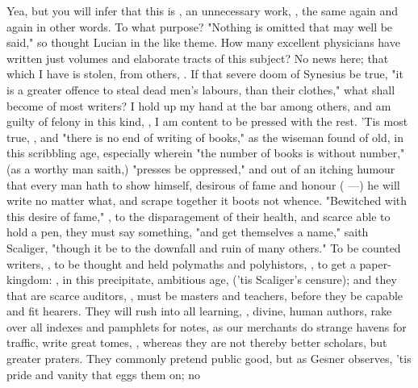 Yea, but you will infer that this is , an
unnecessary work, , the same again and again
in other words. To what purpose? "Nothing is omitted that
may well be said," so thought Lucian in the like theme. How many excellent
physicians have written just volumes and elaborate tracts of this subject? No
news here; that which I have is stolen, from others,
. If that severe doom of
Synesius be true, "it is a greater offence to steal dead
men's labours, than their clothes," what shall become of most writers? I hold
up my hand at the bar among others, and am guilty of felony in this kind,
, I am content to be pressed with the rest. 'Tis
most true, , and
"there is no end of writing of books," as the wiseman found
of old, in this scribbling age, especially wherein
"the number of books is without number," (as a worthy man
saith,) "presses be oppressed," and out of an itching humour that every man
hath to show himself, desirous of fame and honour
( ---) he will write no matter what, and scrape
together it boots not whence. "Bewitched with this desire of
fame," , to the disparagement of their health, and
scarce able to hold a pen, they must say something, "and get
themselves a name," saith Scaliger, "though it be to the downfall and ruin of
many others." To be counted writers, , to be
thought and held polymaths and polyhistors, , to get a paper-kingdom: , in this precipitate, ambitious age,  ('tis
Scaliger's censure); and they that are scarce auditors,
, must be masters and teachers, before they be capable and
fit hearers. They will rush into all learning, , divine,
human authors, rake over all indexes and pamphlets for notes, as our merchants
do strange havens for traffic, write great tomes, , whereas they are not thereby better scholars, but
greater praters. They commonly pretend public good, but as
Gesner observes, 'tis pride and vanity that eggs them on; no
